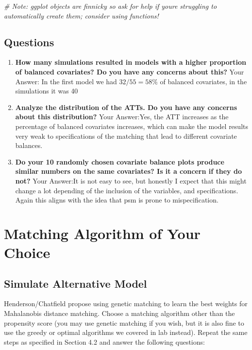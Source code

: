 \documentclass[
]{article}
\newenvironment{Shaded}{\begin{snugshade}}{\end{snugshade}}
\newcommand{\CommentTok}[1]{\textcolor[rgb]{0.56,0.35,0.01}{\textit{#1}}}
\begin{document}
\begin{Shaded}
\begin{Highlighting}[]
\CommentTok{\# Note: ggplot objects are finnicky so ask for help if you\textquotesingle{}re struggling to automatically create them; consider using functions!}
\end{Highlighting}
\end{Shaded}

\hypertarget{questions-1}{%
\subsection{Questions}\label{questions-1}}

\begin{enumerate}
    \item \textbf{How many simulations resulted in models with a higher proportion of balanced covariates? Do you have any concerns about this?}
    Your Answer: In the first model we had $32/55=58\%$ of balanced covariates, in the simulations it was 40%
    \item \textbf{Analyze the distribution of the ATTs. Do you have any concerns about this distribution?}
    Your Answer:Yes, the ATT increases as the percentage of balanced covariates increases, which can make the model results very weak to specifications of the matching that lead to different covariate balances. 
    \item \textbf{Do your 10 randomly chosen covariate balance plots produce similar numbers on the same covariates? Is it a concern if they do not?}
    Your Answer:It is not easy to see, but honestly I expect that this might change a lot depending of the inclusion of the variables, and specifications. Again this aligns with the idea that psm is prone to mispecification.  
\end{enumerate}

\hypertarget{matching-algorithm-of-your-choice}{%
\section{Matching Algorithm of Your
Choice}\label{matching-algorithm-of-your-choice}}

\hypertarget{simulate-alternative-model}{%
\subsection{Simulate Alternative
Model}\label{simulate-alternative-model}}

Henderson/Chatfield propose using genetic matching to learn the best
weights for Mahalanobis distance matching. Choose a matching algorithm
other than the propensity score (you may use genetic matching if you
wish, but it is also fine to use the greedy or optimal algorithms we
covered in lab instead). Repeat the same steps as specified in Section
4.2 and answer the following questions:
\end{document}
